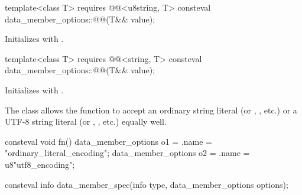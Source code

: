 \begin{itemdecl}
template<class T>
  requires @@<u8string, T>
  consteval data_member_options::@@(T&& value);
\end{itemdecl}

\begin{itemdescr}
\pnum
\effects
Initializes 
with .
\end{itemdescr}

\begin{itemdecl}
template<class T>
  requires @@<string, T>
  consteval data_member_options::@@(T&& value);
\end{itemdecl}

\begin{itemdescr}
\pnum
\effects
Initializes 
with .
\begin{note}
The class  allows
the function  to accept
an ordinary string literal (or , , etc.)
or a UTF-8 string literal (or , , etc.)
equally well.
\begin{example}
\begin{codeblock}
consteval void fn() {
  data_member_options o1 = {.name = "ordinary_literal_encoding"};
  data_member_options o2 = {.name = u8"utf8_encoding"};
}
\end{codeblock}
\end{example}
\end{note}
\end{itemdescr}

%
\begin{itemdecl}
consteval info data_member_spec(info type, data_member_options options);
\end{itemdecl}

